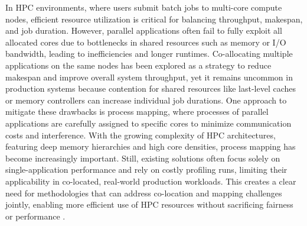 In HPC environments, where users submit batch jobs to multi-core compute nodes, efficient resource utilization is critical for balancing throughput, makespan, and job duration. However, parallel applications often fail to fully exploit all allocated cores due to bottlenecks in shared resources such as memory or I/O bandwidth, leading to inefficiencies and longer runtimes. Co-allocating multiple applications on the same nodes has been explored as a strategy to reduce makespan and improve overall system throughput, yet it remains uncommon in production systems because contention for shared resources like last-level caches or memory controllers can increase individual job durations. One approach to mitigate these drawbacks is process mapping, where processes of parallel applications are carefully assigned to specific cores to minimize communication costs and interference. With the growing complexity of HPC architectures, featuring deep memory hierarchies and high core densities, process mapping has become increasingly important. Still, existing solutions often focus solely on single-application performance and rely on costly profiling runs, limiting their applicability in co-located, real-world production workloads. This creates a clear need for methodologies that can address co-location and mapping challenges jointly, enabling more efficient use of HPC resources without sacrificing fairness or performance \cite{10.1007/978-3-031-48803-0_31}.


